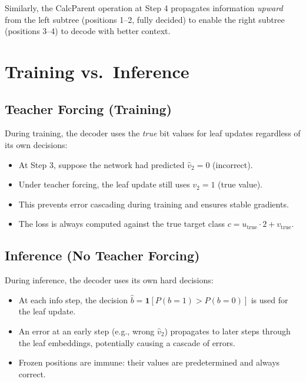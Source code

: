 \documentclass[11pt,a4paper]{article}
\begin{document}
Similarly, the CalcParent operation at Step 4 propagates information \emph{upward} from the left subtree (positions 1--2, fully decided) to enable the right subtree (positions 3--4) to decode with better context.

\section{Training vs.\ Inference}
\label{sec:train_vs_infer}

\subsection{Teacher Forcing (Training)}

During training, the decoder uses the \emph{true} bit values for leaf updates regardless of its own decisions:
\begin{itemize}[nosep]
\item At Step 3, suppose the network had predicted $\hat{v}_2 = 0$ (incorrect).
\item Under teacher forcing, the leaf update still uses $v_2 = 1$ (true value).
\item This prevents error cascading during training and ensures stable gradients.
\item The loss is always computed against the true target class $c = u_{\text{true}} \cdot 2 + v_{\text{true}}$.
\end{itemize}

\subsection{Inference (No Teacher Forcing)}

During inference, the decoder uses its own hard decisions:
\begin{itemize}[nosep]
\item At each info step, the decision $\hat{b} = \mathbf{1}[P(b{=}1) > P(b{=}0)]$ is used for the leaf update.
\item An error at an early step (e.g., wrong $\hat{v}_2$) propagates to later steps through the leaf embeddings, potentially causing a cascade of errors.
\item Frozen positions are immune: their values are predetermined and always correct.
\end{itemize}
\end{document}
